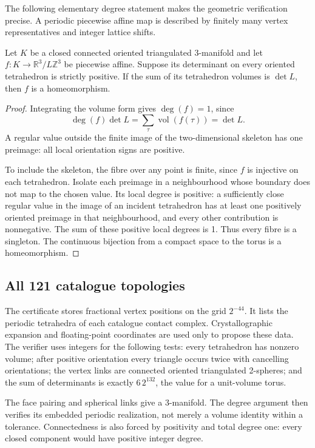 \documentclass[11pt,a4paper]{report}
\begin{document}
The following elementary degree statement makes the geometric verification
precise. A periodic piecewise affine map is described by finitely many
vertex representatives and integer lattice shifts.

\begin{lemma}\label{lem:degree}
Let $K$ be a closed connected oriented triangulated 3-manifold and let
$f:K\to\mathbb R^3/L\mathbb Z^3$ be piecewise affine. Suppose its determinant
on every oriented tetrahedron is strictly positive. If the sum of its
tetrahedron volumes is $\det L$, then $f$ is a homeomorphism.
\end{lemma}
\begin{proof}
Integrating the volume form gives $\deg(f)=1$, since
\[
 \deg(f)\det L=\sum_\tau\operatorname{vol}(f(\tau))=\det L.
\]
A regular value outside the finite image of the two-dimensional skeleton
has one preimage: all local orientation signs are positive.

To include the skeleton, the fibre over any point is finite, since $f$ is
injective on each tetrahedron. Isolate each preimage in a neighbourhood
whose boundary does not map to the chosen value. Its local degree is
positive: a sufficiently close regular value in the image of an incident
tetrahedron has at least one positively oriented preimage in that
neighbourhood, and every other contribution is nonnegative. The sum of
these positive local degrees is 1. Thus every fibre is a singleton.
The continuous bijection from a compact space to the torus is a
homeomorphism.
\end{proof}

\subsection{All 121 catalogue topologies}

The certificate stores fractional vertex positions on the grid $2^{-44}$.
It lists the periodic tetrahedra of each catalogue contact complex.
Crystallographic expansion and floating-point coordinates are used only
to propose these data. The verifier uses integers for the following tests:
every tetrahedron has nonzero volume; after positive orientation every
triangle occurs twice with cancelling orientations; the vertex links are
connected oriented triangulated 2-spheres; and the sum of determinants is
exactly $6\,2^{132}$, the value for a unit-volume torus.

The face pairing and spherical links give a 3-manifold. The degree argument
then verifies its embedded periodic realization, not merely a volume
identity within a tolerance. Connectedness is also forced by positivity
and total degree one: every closed component would have positive integer
degree.
\end{document}
